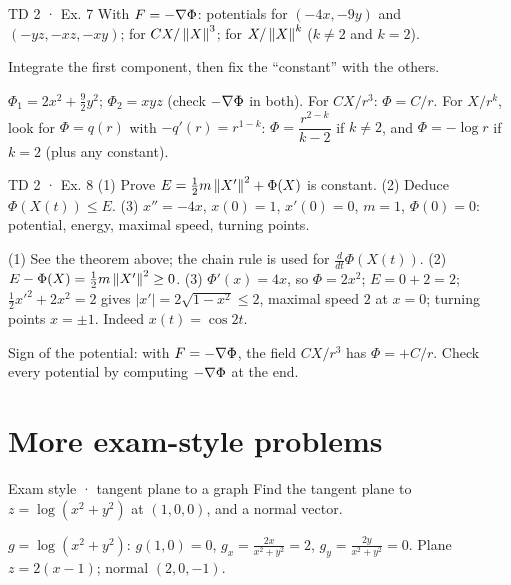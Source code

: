 \begin{problem}{TD 2 · Ex. 7}
With $F=-\nabla\Phi$: potentials for $(-4x,-9y)$ and $(-yz,-xz,-xy)$; for $CX/\left\lVert X\right\rVert^3$; for
$X/\left\lVert X\right\rVert^k$ ($k\ne2$ and $k=2$).
\end{problem}
\begin{hint}Integrate the first component, then fix the ``constant'' with the others.\end{hint}
\begin{solution}
$\Phi_1=2x^2+\tfrac92y^2$; $\Phi_2=xyz$ (check $-\nabla\Phi$ in both). For $CX/r^3$:
$\Phi=C/r$. For $X/r^k$, look for $\Phi=q(r)$ with $-q'(r)=r^{1-k}$:
$\Phi=\dfrac{r^{2-k}}{k-2}$ if $k\ne2$, and $\Phi=-\log r$ if $k=2$ (plus any constant).
\end{solution}

\begin{problem}{TD 2 · Ex. 8}
(1) Prove $E=\tfrac12m\left\lVert X'\right\rVert^2+\Phi(X)$ is constant. (2) Deduce $\Phi(X(t))\le E$.
(3) $x''=-4x$, $x(0)=1$, $x'(0)=0$, $m=1$, $\Phi(0)=0$: potential, energy, maximal speed,
turning points.
\end{problem}
\begin{solution}
(1) See the theorem above; the chain rule is used for $\frac{d}{dt}\Phi(X(t))$.
(2) $E-\Phi(X)=\tfrac12m\left\lVert X'\right\rVert^2\ge0$.
(3) $\Phi'(x)=4x$, so $\Phi=2x^2$; $E=0+2=2$; $\tfrac12x'^2+2x^2=2$ gives $|x'|=2\sqrt{1-x^2}\le2$,
maximal speed $2$ at $x=0$; turning points $x=\pm1$. Indeed $x(t)=\cos2t$.
\end{solution}

\begin{trap}
Sign of the potential: with $F=-\nabla\Phi$, the field $CX/r^3$ has $\Phi=+C/r$. Check every
potential by computing $-\nabla\Phi$ at the end.
\end{trap}

\section{More exam-style problems}

\begin{problem}{Exam style · tangent plane to a graph}
Find the tangent plane to $z=\log(x^2+y^2)$ at $(1,0,0)$, and a normal vector.
\end{problem}
\begin{solution}
$g=\log(x^2+y^2)$: $g(1,0)=0$, $g_x=\frac{2x}{x^2+y^2}=2$, $g_y=\frac{2y}{x^2+y^2}=0$. Plane $z=2(x-1)$;
normal $(2,0,-1)$.
\end{solution}

